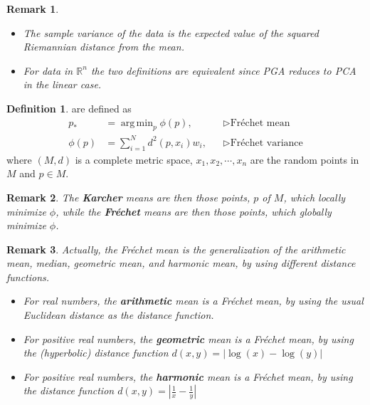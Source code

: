 \documentclass[a4paper]{article}
\theoremstyle{definition}
\newtheorem{definition}{Definition}
\theoremstyle{plain}
\newtheorem{remark}{Remark}
\DeclareMathOperator*{\argmin}{arg\,min}
\begin{document}
\begin{remark}
\begin{itemize}
    \item The sample variance of the data is the expected value of the squared Riemannian distance from the mean.
    \item For data in $\mathbb{R}^n$ the two definitions are equivalent since PGA reduces to PCA in the linear case.
\end{itemize}
\end{remark}

\begin{definition}
 are defined as
\begin{align*}
    p_*&=\argmin_p\phi(p), && \triangleright\text{Fréchet mean}\\
    \phi(p)&=\sum^N_{i=1}d^2(p,x_i)w_i, && \triangleright\text{Fréchet variance}
\end{align*}
where $(M,d)$ is a complete metric space, $x_1,x_2,\cdots,x_n$ are the random points in $M$ and $p\in M$.
\end{definition}

\begin{remark}
The \textbf{Karcher} means are then those points, $p$ of $M$, which locally minimize $\phi$, while the \textbf{Fréchet} means are then those points, which globally minimize $\phi$.
\end{remark}

\begin{remark}
Actually, the Fréchet mean is the generalization of the arithmetic mean, median, geometric mean, and harmonic mean, by using different distance functions.
\begin{itemize}
    \item For real numbers, the \textbf{arithmetic} mean is a Fréchet mean, by using the usual Euclidean distance as the distance function.
    \item For positive real numbers, the \textbf{geometric} mean is a Fréchet mean, by using the (hyperbolic) distance function $d(x,y)=|\log(x)-\log(y)|$
    \item For positive real numbers, the \textbf{harmonic} mean is a Fréchet mean, by using the distance function $d(x,y)=|\frac{1}{x}-\frac{1}{y}|$
\end{itemize}
\end{remark}
\end{document}
